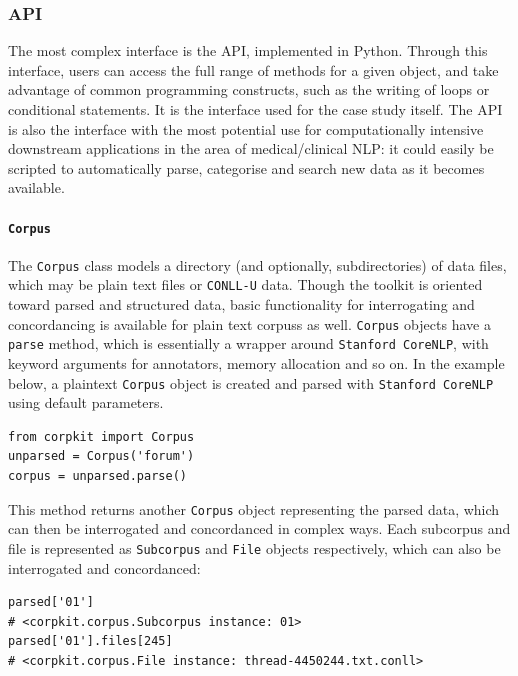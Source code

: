 \subsubsection{API}

The most complex interface is the \gls{API}, implemented in Python. Through this interface, users can access the full range of methods for a given object, and take advantage of common programming constructs, such as the writing of loops or conditional statements. It is the interface used for the case study itself. The \gls{API} is also the interface with the most potential use for computationally intensive downstream applications in the area of medical\slash clinical \gls{NLP}: it could easily be scripted to automatically parse, categorise and search new data as it becomes available.

\paragraph{\texttt{Corpus}}

The \texttt{Corpus} class models a directory (and optionally, subdirectories) of data files, which may be plain text files or \texttt{CONLL-U} data. Though the toolkit is oriented toward parsed and structured data, basic functionality for interrogating and concordancing is available for plain text \glspl{corpus} as well. \texttt{Corpus} objects have a \texttt{parse} method, which is essentially a wrapper around \texttt{Stanford CoreNLP}, with keyword arguments for annotators, memory allocation and so on. In the example below, a plaintext \texttt{Corpus} object is created and parsed with \texttt{Stanford CoreNLP} using default parameters.

\begin{verbatim}
from corpkit import Corpus
unparsed = Corpus('forum')
corpus = unparsed.parse()
\end{verbatim} 
%
This method returns another \texttt{Corpus} object representing the parsed data, which can then be interrogated and concordanced in complex ways. Each subcorpus and file is represented as \texttt{Subcorpus} and \texttt{File} objects respectively, which can also be interrogated and concordanced:

\begin{verbatim}
parsed['01']
# <corpkit.corpus.Subcorpus instance: 01>
parsed['01'].files[245]
# <corpkit.corpus.File instance: thread-4450244.txt.conll>
\end{verbatim}

